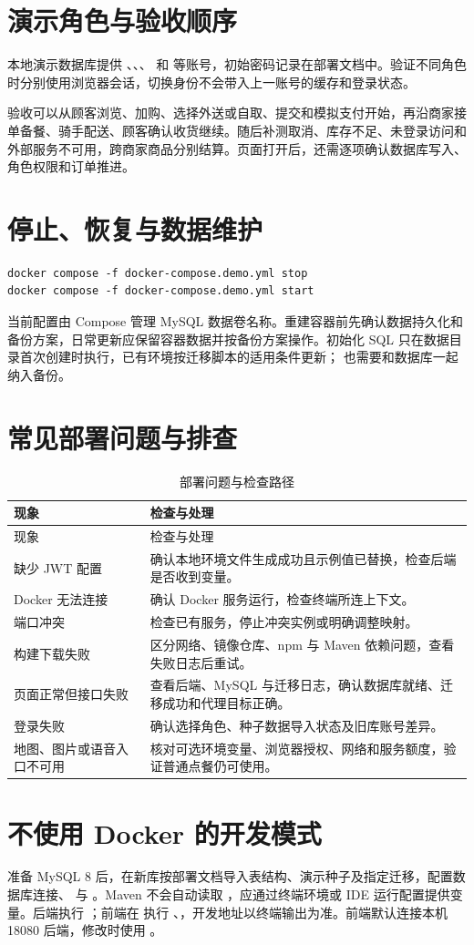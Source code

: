 \section{演示角色与验收顺序}
本地演示数据库提供 、、、 和  等账号，初始密码记录在部署文档中。验证不同角色时分别使用浏览器会话，切换身份不会带入上一账号的缓存和登录状态。

验收可以从顾客浏览、加购、选择外送或自取、提交和模拟支付开始，再沿商家接单备餐、骑手配送、顾客确认收货继续。随后补测取消、库存不足、未登录访问和外部服务不可用，跨商家商品分别结算。页面打开后，还需逐项确认数据库写入、角色权限和订单推进。
\section{停止、恢复与数据维护}
\begin{lstlisting}
docker compose -f docker-compose.demo.yml stop
docker compose -f docker-compose.demo.yml start
\end{lstlisting}
当前配置由 Compose 管理 MySQL 数据卷名称。重建容器前先确认数据持久化和备份方案，日常更新应保留容器数据并按备份方案操作。初始化 SQL 只在数据目录首次创建时执行，已有环境按迁移脚本的适用条件更新； 也需要和数据库一起纳入备份。
\section{常见部署问题与排查}
\begin{longtable}{L{.26\linewidth}L{.65\linewidth}}
\caption{部署问题与检查路径}\label{tab:deploy-troubles}\\\toprule 现象&检查与处理\\\midrule\endfirsthead\toprule 现象&检查与处理\\\midrule\endhead
缺少 JWT 配置&确认本地环境文件生成成功且示例值已替换，检查后端是否收到变量。\\
Docker 无法连接&确认 Docker 服务运行，检查终端所连上下文。\\
端口冲突&检查已有服务，停止冲突实例或明确调整映射。\\
构建下载失败&区分网络、镜像仓库、npm 与 Maven 依赖问题，查看失败日志后重试。\\
页面正常但接口失败&查看后端、MySQL 与迁移日志，确认数据库就绪、迁移成功和代理目标正确。\\
登录失败&确认选择角色、种子数据导入状态及旧库账号差异。\\
地图、图片或语音入口不可用&核对可选环境变量、浏览器授权、网络和服务额度，验证普通点餐仍可使用。\\\bottomrule
\end{longtable}
\section{不使用 Docker 的开发模式}
准备 MySQL 8 后，在新库按部署文档导入表结构、演示种子及指定迁移，配置数据库连接、 与 。Maven 不会自动读取 ，应通过终端环境或 IDE 运行配置提供变量。后端执行 ；前端在  执行 、，开发地址以终端输出为准。前端默认连接本机 18080 后端，修改时使用 。

